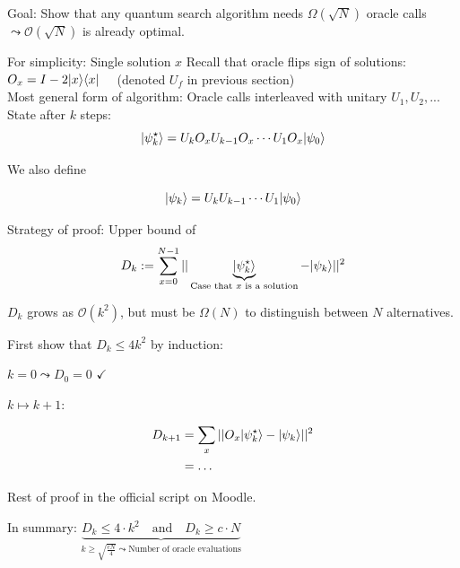 Goal: Show that any quantum search algorithm needs $\Omega(\sqrt{N})$ oracle calls
$\leadsto \mathcal{O}(\sqrt{N})$ is already optimal.

For simplicity: Single solution $x$
Recall that oracle flips sign of solutions:
$O_x = I - 2 \lvert x\rangle\langle x\rvert \quad $ (denoted $U_f$ in previous section) \\
Most general form of algorithm: Oracle calls interleaved with unitary $U_1, U_2, ...$ \\

State after $k$ steps:
\begin{equation}
    \lvert\psi_k^\star\rangle = U_k O_x U_{k-1} O_x \cdots U_1 O_x \lvert\psi_0\rangle
\end{equation}

We also define

\begin{equation}
    \lvert\psi_k\rangle = U_k U_{k-1} \cdots U_1 \lvert\psi_0\rangle
\end{equation}

Strategy of proof: Upper bound of 
\begin{equation}
    D_k := \sum_{x = 0}^{N - 1} || \underbrace{\lvert\psi_k^\star\rangle}_{\text{Case that $x$ is a solution}} 
    - \lvert\psi_k\rangle ||^2
\end{equation}

$D_k$ grows as $\mathcal{O}(k^2)$, but must be $\Omega(N)$ to distinguish between $N$ alternatives.


First show that $D_k \leq 4 k^2$ by induction:

$k = 0 \leadsto D_0= 0$ {\color{green} $\checkmark$}

$k \mapsto k + 1$:

\begin{align*}
    D_{k + 1} &= \sum_x || O_x \lvert\psi_k^\star\rangle - \lvert\psi_k\rangle ||^2 \\
    &= \dots
\end{align*}

Rest of proof in the official script on Moodle.

In summary: $\underbrace{D_k \leq 4 \cdot k^2 \quad \text{and} \quad D_k \geq c \cdot N}
    _{k \geq \sqrt{\frac{cN}{4}} \leadsto \text{Number of oracle evaluations}}$